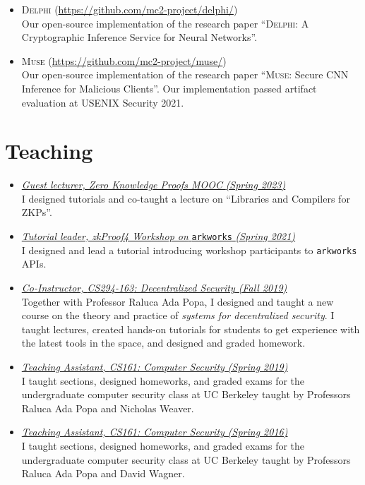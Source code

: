 \documentclass[11pt]{article}
\begin{document}
\begin{cv}{\vspace{-5em}}
\begin{itemize}[itemsep=1em]
    \item[] \textsc{Delphi} {\footnotesize(\url{https://github.com/mc2-project/delphi/})}\\
      Our open-source implementation of the research paper ``\textsc{Delphi}: {A} Cryptographic Inference Service for Neural Networks''.

    \item[] \textsc{Muse} {\footnotesize(\url{https://github.com/mc2-project/muse/})}\\
      Our open-source implementation of the research paper ``\textsc{Muse}: Secure CNN Inference for Malicious Clients''. Our implementation passed artifact evaluation at USENIX Security 2021.
  \end{itemize}
  
  {\section*{Teaching}}
  \begin{itemize}[itemsep=1em]
    \item[] \href{https://zk-learning.org/}{\emph{Guest lecturer, Zero Knowledge Proofs MOOC} \emph{(Spring 2023)}}\\
      {\small
      I designed tutorials and co-taught a lecture on ``Libraries and Compilers for ZKPs''.}

    \item[] \href{https://github.com/arkworks-rs/r1cs-tutorial/}{\emph{Tutorial leader, zkProof4 Workshop on} \texttt{arkworks} \emph{(Spring 2021)}}\\
      {\small
      I designed and lead a tutorial introducing workshop participants to \texttt{arkworks} APIs.}

    \item[] \href{https://inst.eecs.berkeley.edu/~cs294-163/fa19/}{\emph{Co-Instructor, {CS294-163}: Decentralized Security (Fall 2019)}}\\
      {\small
        Together with Professor Raluca Ada Popa, I designed and taught a new course on the theory and practice of \emph{systems for decentralized security}. I taught lectures, created hands-on tutorials for students to get experience with the latest tools in the space, and designed and graded homework.
      }
    \item[] \href{https://inst.eecs.berkeley.edu/~cs161/sp19/}{\emph{Teaching Assistant, {CS161}: Computer Security (Spring 2019)}}\\
      {\small
      I taught sections, designed homeworks, and graded exams for the undergraduate computer security class at UC Berkeley taught by Professors Raluca Ada Popa and Nicholas Weaver.}
    \item[] \href{https://inst.eecs.berkeley.edu/~cs161/sp16/}{\emph{Teaching Assistant, {CS161}: Computer Security (Spring 2016)}}\\
      {\small
      I taught sections, designed homeworks, and graded exams for the undergraduate computer security class at UC Berkeley taught by Professors Raluca Ada Popa and David Wagner.}
    

\end{itemize}
\end{cv}
\end{document}
